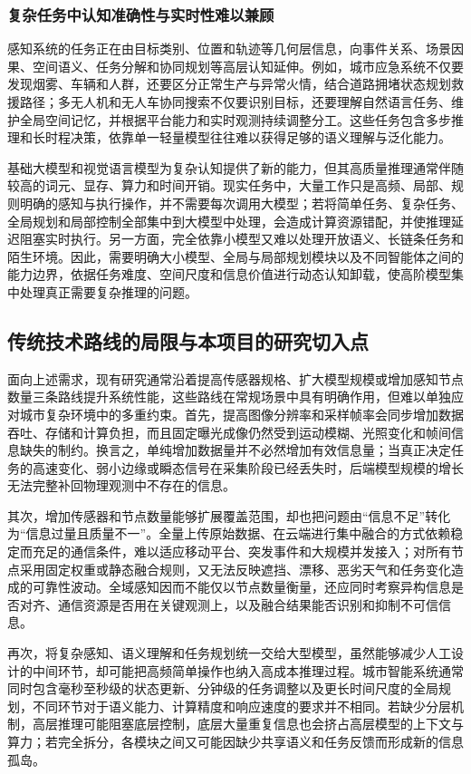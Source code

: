 \subsubsection{复杂任务中认知准确性与实时性难以兼顾}

感知系统的任务正在由目标类别、位置和轨迹等几何层信息，向事件关系、场景因果、空间语义、任务分解和协同规划等高层认知延伸。例如，城市应急系统不仅要发现烟雾、车辆和人群，还要区分正常生产与异常火情，结合道路拥堵状态规划救援路径；多无人机和无人车协同搜索不仅要识别目标，还要理解自然语言任务、维护全局空间记忆，并根据平台能力和实时观测持续调整分工。这些任务包含多步推理和长时程决策，依靠单一轻量模型往往难以获得足够的语义理解与泛化能力。

基础大模型和视觉语言模型为复杂认知提供了新的能力，但其高质量推理通常伴随较高的词元、显存、算力和时间开销。现实任务中，大量工作只是高频、局部、规则明确的感知与执行操作，并不需要每次调用大模型；若将简单任务、复杂任务、全局规划和局部控制全部集中到大模型中处理，会造成计算资源错配，并使推理延迟阻塞实时执行。另一方面，完全依靠小模型又难以处理开放语义、长链条任务和陌生环境。因此，需要明确大小模型、全局与局部规划模块以及不同智能体之间的能力边界，依据任务难度、空间尺度和信息价值进行动态认知卸载，使高阶模型集中处理真正需要复杂推理的问题。

\subsection{传统技术路线的局限与本项目的研究切入点}

面向上述需求，现有研究通常沿着提高传感器规格、扩大模型规模或增加感知节点数量三条路线提升系统性能，这些路线在常规场景中具有明确作用，但难以单独应对城市复杂环境中的多重约束。首先，提高图像分辨率和采样帧率会同步增加数据吞吐、存储和计算负担，而且固定曝光成像仍然受到运动模糊、光照变化和帧间信息缺失的制约。换言之，单纯增加数据量并不必然增加有效信息量；当真正决定任务的高速变化、弱小边缘或瞬态信号在采集阶段已经丢失时，后端模型规模的增长无法完整补回物理观测中不存在的信息。

其次，增加传感器和节点数量能够扩展覆盖范围，却也把问题由“信息不足”转化为“信息过量且质量不一”。全量上传原始数据、在云端进行集中融合的方式依赖稳定而充足的通信条件，难以适应移动平台、突发事件和大规模并发接入；对所有节点采用固定权重或静态融合规则，又无法反映遮挡、漂移、恶劣天气和任务变化造成的可靠性波动。全域感知因而不能仅以节点数量衡量，还应同时考察异构信息是否对齐、通信资源是否用在关键观测上，以及融合结果能否识别和抑制不可信信息。

再次，将复杂感知、语义理解和任务规划统一交给大型模型，虽然能够减少人工设计的中间环节，却可能把高频简单操作也纳入高成本推理过程。城市智能系统通常同时包含毫秒至秒级的状态更新、分钟级的任务调整以及更长时间尺度的全局规划，不同环节对于语义能力、计算精度和响应速度的要求并不相同。若缺少分层机制，高层推理可能阻塞底层控制，底层大量重复信息也会挤占高层模型的上下文与算力；若完全拆分，各模块之间又可能因缺少共享语义和任务反馈而形成新的信息孤岛。

